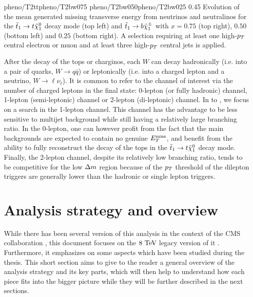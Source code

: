                  {pheno/T2tt}{pheno/T2bw075}
                 {pheno/T2bw050}{pheno/T2bw025}
                 {0.45}
                 {Evolution of the mean generated missing transverse energy from
                 neutrinos and neutralinos for the $\tilde{t}_1 \rightarrow t
                 \tilde{\chi}_1^0$ decay mode (top left) and $\tilde{t}_1 \rightarrow b
                 \tilde{\chi}_1^\pm$ with $x = 0.75$ (top right), $0.50$ (bottom left)
                 and $0.25$ (bottom right).  A selection requiring at least one
                 high-$p_T$ central electron or muon and at least three
                 high-$p_T$ central jets is applied.}

    After the decay of the tops or charginos, each $W$ can decay hadronically
    (i.e. into a pair of quarks, $W \rightarrow q\bar{q}$) or leptonically (i.e.
    into a charged lepton and a neutrino, $W \rightarrow \ell \nu_{\ell}$). It
    is common to refer to the channel of interest via the number of charged
    leptons in the final state: 0-lepton (or fully hadronic) channel, 1-lepton
    (semi-leptonic) channel or 2-lepton (di-leptonic) channel. In
     to , we
    focus on a search in the 1-lepton channel. This channel has the advantage to
    be less sensitive to multijet background while still having a relatively
    large branching ratio. In the 0-lepton, one can however profit from the fact
    that the main backgrounds are expected to contain no genuine $E_T^\text{miss}$, and
    benefit from the ability to fully reconstruct the decay of the tops in the
    $\tilde{t}_1 \rightarrow t \tilde{\chi}_1^0$ decay mode. Finally, the 2-lepton
    channel, despite its relatively low branching ratio, tends to be competitive
    for the low $\Delta m$ region because of the $p_T$ threshold of the dilepton
    triggers are generally lower than the hadronic or single lepton triggers.

    \section{Analysis strategy and overview \label{sec:analysis_overview}}

    While there has been several version of this analysis in the context of the
    CMS collaboration \cite{SUS-12-023-PAS, SUS-13-011-PUB, SUS-14-015-PAS},
    this document focuses on the $8~\text{TeV}$ legacy version of it
    \cite{SUS-14-015-PAS}. Furthermore, it emphasizes on some aspects which have
    been studied during the thesis.  This short section aims to give to the
    reader a general overview of the analysis strategy and its key parts, which
    will then help to understand how each piece fits into the bigger picture
    while they will be further described in the next sections.

